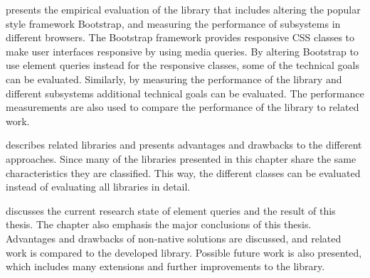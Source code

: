 \documentclass[a4paper,11pt]{kth-mag}
\begin{document}
       presents the empirical evaluation of the library that includes altering the popular style framework \gls{Bootstrap}, and measuring the performance of subsystems in different \glspl{browser}.
      The \gls{Bootstrap} framework provides \gls{responsive} \gls{CSS} classes to make user interfaces \gls{responsive} by using \gls{media queries}.
      By altering \gls{Bootstrap} to use element queries instead for the \gls{responsive} classes, some of the technical goals can be evaluated.
      Similarly, by measuring the performance of the library and different subsystems additional technical goals can be evaluated.
      The performance measurements are also used to compare the performance of the library to related work.

       describes related libraries and presents advantages and drawbacks to the different approaches.
      Since many of the libraries presented in this chapter share the same characteristics they are classified.
      This way, the different classes can be evaluated instead of evaluating all libraries in detail.

       discusses the current research state of element queries and the result of this thesis.
      The chapter also emphasis the major conclusions of this thesis.
      Advantages and drawbacks of non-\gls{native} solutions are discussed, and related work is compared to the developed library.
      Possible future work is also presented, which includes many extensions and further improvements to the library.


\end{document}
